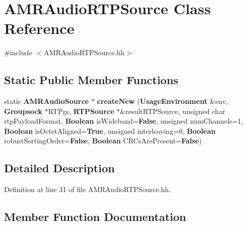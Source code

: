 \section{A\+M\+R\+Audio\+R\+T\+P\+Source Class Reference}
\label{classAMRAudioRTPSource}


{\ttfamily \#include $<$A\+M\+R\+Audio\+R\+T\+P\+Source.\+hh$>$}

\subsection*{Static Public Member Functions}
\begin{DoxyCompactItemize}
\item 
static {\bf A\+M\+R\+Audio\+Source} $\ast$ {\bf create\+New} ({\bf Usage\+Environment} \&env, {\bf Groupsock} $\ast$R\+T\+Pgs, {\bf R\+T\+P\+Source} $\ast$\&result\+R\+T\+P\+Source, unsigned char rtp\+Payload\+Format, {\bf Boolean} is\+Wideband={\bf False}, unsigned num\+Channels=1, {\bf Boolean} is\+Octet\+Aligned={\bf True}, unsigned interleaving=0,       {\bf Boolean} robust\+Sorting\+Order={\bf False}, {\bf Boolean} C\+R\+Cs\+Are\+Present={\bf False})
\end{DoxyCompactItemize}


\subsection{Detailed Description}


Definition at line 31 of file A\+M\+R\+Audio\+R\+T\+P\+Source.\+hh.



\subsection{Member Function Documentation}

